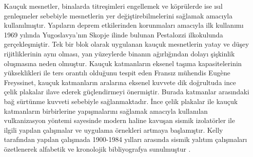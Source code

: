 Kauçuk mesnetler, binalarda titreşimleri engellemek ve köprülerde
ise ısıl genleşmeler sebebiyle mesnetlerin yer değiştirebilmelerini
sağlamak amacıyla kullanılmıştır. Yapıların deprem etkilerinden korunmaları
amacıyla ilk kullanımı 1969 yılında Yugoslavya'nın Skopje ilinde bulunan
Pestalozzi ilkokulunda gerçekleşmiştir. Tek bir blok olarak uygulanan
kauçuk mesnetlerin yatay ve düşey rijitliklerinin aynı olması, yan
yüzeylerde binanın ağırlığından dolayı şişkinlik oluşmasına neden
olmuştur. Kauçuk katmanların eksenel taşıma kapasitelerinin yükseklikleri
ile ters orantılı olduğunu tespit eden Fransız mühendis Eugène Freyssinet,
kauçuk katmanların aralarına eksenel kuvvete dik doğrultuda ince çelik
plakalar ilave ederek güçlendirmeyi önermiştir. Burada katmanlar arasındaki
bağ sürtünme kuvveti sebebiyle sağlanmaktadır. İnce çelik plakalar
ile kauçuk katmanların birbirlerine yapışmalarını sağlamak amacıyla
kullanılan vulkanizasyon yöntemi sayesinde modern haline kavuşan sismik
izolatörler ile ilgili yapılan çalışmalar ve uygulama örnekleri artmaya
başlamıştır. Kelly tarafından yapılan çalışmada 1900-1984 yılları
arasında sismik yalıtım çalışmaları özetlenerek alfabetik ve kronolojik
bibliyografya sunulmuştur \cite{KELLY1986202}.

